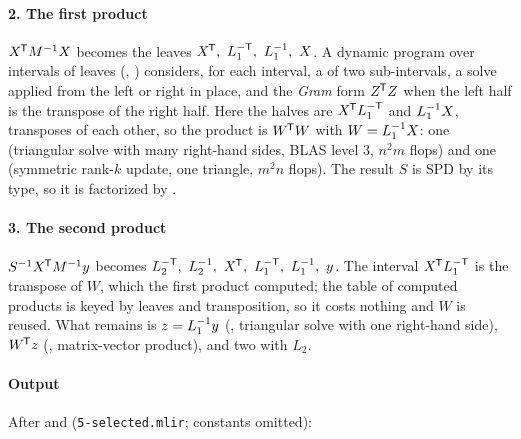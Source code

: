 \paragraph{2. The first product} \(X^{\mkern-1.5mu\mathsf{T}} M^{-1} X\) becomes the leaves
\(X^{\mkern-1.5mu\mathsf{T}},\ L_1^{-\mathsf{T}},\ L_1^{-1},\ X\). A dynamic program over intervals of
leaves (, )
considers, for each interval, a  of two sub-intervals, a solve
applied from the left or right in place, and the \emph{Gram} form \(Z^{\mkern-1.5mu\mathsf{T}} Z\)
when the left half is the transpose of the right half. Here the halves are
\(X^{\mkern-1.5mu\mathsf{T}} L_1^{-\mathsf{T}}\) and \(L_1^{-1} X\), transposes of each other, so the
product is \(W^{\mkern-1.5mu\mathsf{T}} W\) with \(W = L_1^{-1} X\): one  (triangular
solve with many right-hand sides, BLAS level 3, \(n^2 m\) flops) and one
 (symmetric rank-\(k\) update, one triangle, \(m^2 n\) flops).
The result \(S\) is SPD by its type, so it is factorized by .

\paragraph{3. The second product} \(S^{-1} X^{\mkern-1.5mu\mathsf{T}} M^{-1} y\) becomes
\(L_2\invT,\ L_2\inv,\ X\T,\ L_1\invT,\ L_1\inv,\ y\). The interval
\(X^{\mkern-1.5mu\mathsf{T}} L_1^{-\mathsf{T}}\) is the transpose of \(W\), which the first product
computed; the table of computed products is keyed by leaves and
transposition, so it costs nothing and \(W\) is reused. What remains is
\(z = L_1^{-1} y\) (, triangular solve with one right-hand side),
\(W^{\mkern-1.5mu\mathsf{T}} z\) (, matrix-vector product), and two  with
\(L_2\).

\paragraph{Output} After  and
 (\texttt{5-selected.mlir}; constants omitted):

